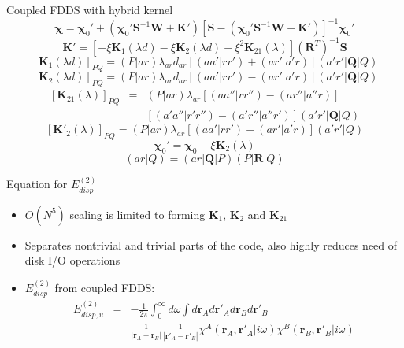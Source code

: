 \documentclass{beamer}
\begin{document}
        \begin{frame}{Coupled FDDS with hybrid kernel}
            $$\boldsymbol{\chi} = \boldsymbol{\chi}_0' + \left( \boldsymbol{\chi}_0' \mathbf{S}^{-1} \mathbf{W} + \mathbf{K}' \right) \left[ \mathbf{S} - \left( \boldsymbol{\chi}_0' \mathbf{S}^{-1} \mathbf{W} + \mathbf{K}' \right) \right]^{-1} \boldsymbol{\chi}_0'$$
            $$\mathbf{K}' = \left[ - \xi \mathbf{K}_1 \left( \lambda d\right) - \xi \mathbf{K}_2 \left( \lambda d\right) + \xi^2 \mathbf{K}_{21} \left( \lambda \right) \right] \left( \mathbf{R}^T \right)^{-1} \mathbf{S}$$
            $$[\mathbf{K}_1 (\lambda d)]_{PQ} = (P|ar) \lambda_{ar} d_{ar} [(aa'|rr')+(ar'|a'r)] (a'r'|\mathbf{Q}|Q)$$
            $$[\mathbf{K}_2 (\lambda d)]_{PQ} = (P|ar) \lambda_{ar} d_{ar} [(aa'|rr')-(ar'|a'r)] (a'r'|\mathbf{Q}|Q)$$
            \begin{eqnarray}
                \nonumber
                [\mathbf{K}_{21} (\lambda)]_{PQ} &=& (P|ar) \lambda_{ar} [(aa''|rr'')-(ar''|a''r)] \\ \nonumber
                & & [(a'a''|r'r'')-(a'r''|a''r')] (a'r'|\mathbf{Q}|Q)
            \end{eqnarray}
            $$[\mathbf{K}'_2 (\lambda)]_{PQ} = (P|ar) \lambda_{ar} [(aa'|rr')-(ar'|a'r)] (a'r'|Q)$$
            $$\boldsymbol{\chi}_0' = \boldsymbol{\chi}_0 - \xi \mathbf{K}_2 \left( \lambda \right)$$
            $$(ar|Q) = (ar|\mathbf{Q}|P)(P|\mathbf{R}|Q)$$
        \end{frame}

        \begin{frame}{Equation for $E_{disp}^{(2)}$}
            \begin{itemize}
                \item $O(N^5)$ scaling is limited to forming  $\mathbf{K}_1$, $\mathbf{K}_2$ and $\mathbf{K}_{21}$
                \item Separates nontrivial and trivial parts of the code, also highly reduces need of disk I/O operations
                \item $E_{disp}^{(2)}$ from coupled FDDS:
                \begin{eqnarray}
                    \nonumber
                    E_{disp,u}^{(2)} &=& -\frac{1}{2\pi}\int_0^\infty d\omega \int d\mathbf{r}_A d\mathbf{r}'_A d\mathbf{r}_B d\mathbf{r}'_B \\ \nonumber
                    & & \frac{1}{|\mathbf{r}_A-\mathbf{r}_B|} \frac{1}{|\mathbf{r}'_A-\mathbf{r}'_B|} \chi^A\left(\mathbf{r}_A,\mathbf{r}'_A|i\omega\right)\chi^B\left(\mathbf{r}_B,\mathbf{r}'_B|i\omega\right)
                \end{eqnarray}
            \end{itemize}
        \end{frame}
        
\end{document}
